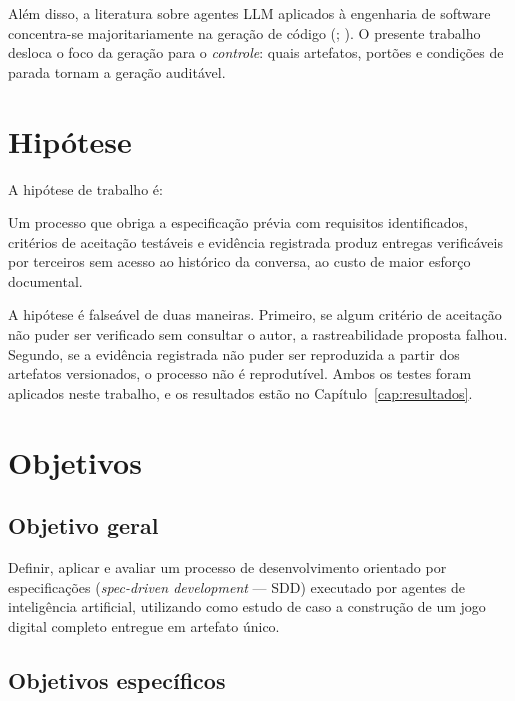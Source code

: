 Além disso, a literatura sobre agentes LLM aplicados à engenharia de software
concentra-se majoritariamente na geração de código
(; ). O presente trabalho
desloca o foco da geração para o \textit{controle}: quais artefatos, portões e
condições de parada tornam a geração auditável.

\section{Hipótese}
\label{sec:hipotese}

A hipótese de trabalho é:

\begin{citacao}
	Um processo que obriga a especificação prévia com requisitos identificados,
	critérios de aceitação testáveis e evidência registrada produz entregas
	verificáveis por terceiros sem acesso ao histórico da conversa, ao custo de
	maior esforço documental.
\end{citacao}

A hipótese é falseável de duas maneiras. Primeiro, se algum critério de aceitação
não puder ser verificado sem consultar o autor, a rastreabilidade proposta
falhou. Segundo, se a evidência registrada não puder ser reproduzida a partir dos
artefatos versionados, o processo não é reprodutível. Ambos os testes foram
aplicados neste trabalho, e os resultados estão no Capítulo~\ref{cap:resultados}.

\section{Objetivos}
\label{sec:objetivos}

\subsection{Objetivo geral}
\label{subsec:objetivo-geral}

Definir, aplicar e avaliar um processo de desenvolvimento orientado por
especificações (\textit{spec-driven development} --- SDD) executado por agentes
de inteligência artificial, utilizando como estudo de caso a construção de um
jogo digital completo entregue em artefato único.

\subsection{Objetivos específicos}
\label{subsec:objetivos-especificos}

